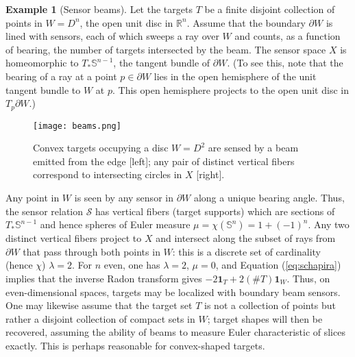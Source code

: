 \documentclass{psapm-l}
\theoremstyle{definition}
\newtheorem{example}[theorem]{Example}
\theoremstyle{remark}
\numberwithin{equation}{section}
\begin{document}
\begin{example}[Sensor beams]
\label{ex:radonbeam}
Let the targets $T$ be a finite disjoint collection of points in $W=D^n$, the open unit disc in ${{\mathbb R}}^n$. Assume that the boundary $\partial W$ is lined with sensors, each of which sweeps a ray over $W$ and counts, as a function of bearing, the number of targets intersected by the beam. The sensor space $X$ is homeomorphic to $T_*{{\mathbb S}}^{n-1}$, the tangent bundle of $\partial W$. (To see this, note that the bearing of a ray at a point $p\in\partial W$ lies in the open hemisphere of the unit tangent bundle to $W$ at $p$. This open hemisphere projects to the open unit disc in $T_p\partial W$.)
\begin{figure}[hbt]
\begin{center}
\texttt{[image: beams.png]}
\caption{Convex targets occupying a disc $W=D^2$ are sensed by a beam emitted from the edge [left]; any pair of distinct vertical fibers correspond to intersecting circles in $X$ [right]. }
\label{fig:beams}
\end{center}
\end{figure}

Any point in $W$ is seen by any sensor in $\partial W$ along a unique bearing angle. Thus, the sensor relation ${{\mathcal S}}$ has vertical fibers (target supports) which are sections of $T_*{{\mathbb S}}^{n-1}$ and hence spheres of Euler measure $\mu=\chi({{\mathbb S}}^n)=1+(-1)^n$.
Any two distinct vertical fibers project to $X$ and intersect along the subset of rays from $\partial W$ that pass through both points in $W$: this is a discrete set of cardinality (hence $\chi$) $\lambda=2$. For $n$ even, one has $\lambda=2$, $\mu=0$, and Equation (\ref{eq:schapira}) implies that the inverse Radon transform gives $-2{{\mathbf{1}}}_T + 2(\# T){{\mathbf{1}}}_W$. Thus, on even-dimensional spaces, targets may be localized with boundary beam sensors. One may likewise assume that the target set $T$ is not a collection of points but rather a disjoint collection of compact sets in $W$; target shapes will then be recovered, assuming the ability of beams to measure Euler characteristic of slices exactly. This is perhaps reasonable for convex-shaped targets.
\end{example}
\end{document}
